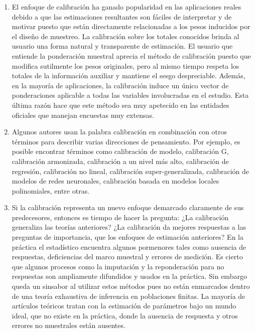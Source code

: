 \documentclass[
  10pt,
  spanish,
]{book}
\begin{document}
\begin{enumerate}
  En algunas ocasiones el término calibración se refiere a una forma de conseguir estimativos consistentes\footnote{En este apartado la palabra consistente se da en el sentido de la consistencia con los totales de la información auxiliar.}. Las ecuaciones de calibración imponen esta propiedad de consistencia sobre el vector de ponderaciones; así que, cuando éste se aplica a las variables auxiliares el resultado será consistente con los totales de estas variables. Un deseo de promover la credibilidad en las estadísticas oficiales es una razón para que las entidades busquen la consistencia. Cuando la motivación primaria para la calibración no es la concordancia con los totales de la información auxiliar sino el reducir la varianza y el sesgo debido a la ausencia de respuesta entonces el vector de ponderaciones se dice balanceado.
\item
  El enfoque de calibración ha ganado popularidad en las aplicaciones reales debido a que las estimaciones resultantes son fáciles de interpretar y de motivar puesto que están directamente relacionadas a los pesos inducidos por el diseño de muestreo. La calibración sobre los totales conocidos brinda al usuario una forma natural y transparente de estimación. El usuario que entiende la ponderación muestral aprecia el método de calibración puesto que modifica sutilmente los pesos originales, pero al mismo tiempo respeta los totales de la información auxiliar y mantiene el sesgo despreciable. Además, en la mayoría de aplicaciones, la calibración induce un único vector de ponderaciones aplicable a todas las variables involucradas en el estudio. Esta última razón hace que este método sea muy apetecido en las entidades oficiales que manejan encuestas muy extensas.
\item
  Algunos autores usan la palabra calibración en combinación con otros términos para describir varias direcciones de pensamiento. Por ejemplo, es posible encontrar términos como calibración de modelo, calibración G, calibración armonizada, calibración a un nivel más alto, calibración de regresión, calibración no lineal, calibración super-generalizada, calibración de modelos de redes neuronales, calibración basada en modelos locales polinomiales, entre otras.
\item
  Si la calibración representa un nuevo enfoque demarcado claramente de sus predecesores, entonces es tiempo de hacer la pregunta: ¿La calibración generaliza las teorías anteriores? ¿La calibración da mejores respuestas a las preguntas de importancia, que los enfoques de estimación anteriores? En la práctica el estadístico encuentra algunos pormenores tales como ausencia de respuestas, deficiencias del marco muestral y errores de medición. Es cierto que algunos procesos como la imputación y la reponderación para no respuestas son ampliamente difundidos y usados en la práctica. Sin embargo queda un sinsabor al utilizar estos métodos pues no están enmarcados dentro de una teoría exhaustiva de inferencia en poblaciones finitas. La mayoría de artículos teóricos tratan con la estimación de parámetros bajo un mundo ideal, que no existe en la práctica, donde la ausencia de respuesta y otros errores no muestrales están ausentes.
\end{enumerate}
\end{document}
